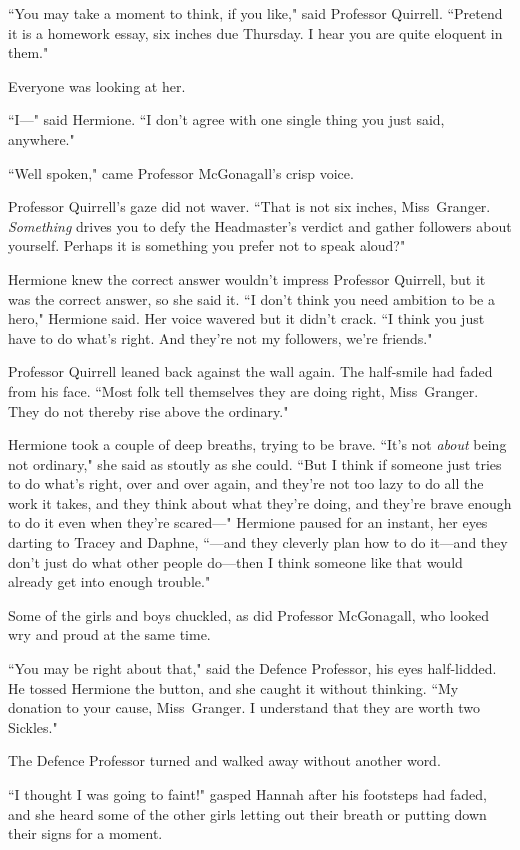``You may take a moment to think, if you like," said Professor Quirrell. ``Pretend it is a homework essay, six inches due Thursday. I hear you are quite eloquent in them."

Everyone was looking at her.

``I—" said Hermione. ``I don't agree with one single thing you just said, anywhere."

``Well spoken," came Professor McGonagall's crisp voice.

Professor Quirrell's gaze did not waver. ``That is not six inches, Miss~Granger. \emph{Something} drives you to defy the Headmaster's verdict and gather followers about yourself. Perhaps it is something you prefer not to speak aloud?"

Hermione knew the correct answer wouldn't impress Professor Quirrell, but it was the correct answer, so she said it. ``I don't think you need ambition to be a hero," Hermione said. Her voice wavered but it didn't crack. ``I think you just have to do what's right. And they're not my followers, we're friends."

Professor Quirrell leaned back against the wall again. The half-smile had faded from his face. ``Most folk tell themselves they are doing right, Miss~Granger. They do not thereby rise above the ordinary."

Hermione took a couple of deep breaths, trying to be brave. ``It's not \emph{about} being not ordinary," she said as stoutly as she could. ``But I think if someone just tries to do what's right, over and over again, and they're not too lazy to do all the work it takes, and they think about what they're doing, and they're brave enough to do it even when they're scared—" Hermione paused for an instant, her eyes darting to Tracey and Daphne, ``—and they cleverly plan how to do it—and they don't just do what other people do—then I think someone like that would already get into enough trouble."

Some of the girls and boys chuckled, as did Professor McGonagall, who looked wry and proud at the same time.

``You may be right about that," said the Defence Professor, his eyes half-lidded. He tossed Hermione the button, and she caught it without thinking. ``My donation to your cause, Miss~Granger. I understand that they are worth two Sickles."

The Defence Professor turned and walked away without another word.

``I thought I was going to faint!" gasped Hannah after his footsteps had faded, and she heard some of the other girls letting out their breath or putting down their signs for a moment.


